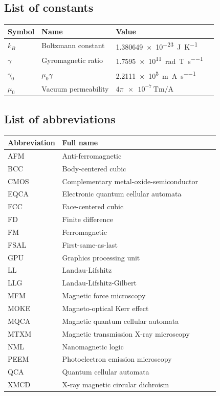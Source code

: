 \documentclass[11pt,a4paper,english]{article}
\begin{document}
\vspace*{\fill}


\clearpage
{\hypersetup{linkcolor=black}
\setcounter{tocdepth}{2}
\tableofcontents
}
\newpage
\subsection*{List of constants}
\begin{longtable}{llll}
\toprule
\bfseries Symbol & \bfseries Name &
\bfseries Value \\\midrule\endhead
$k_B$ & Boltzmann constant & \SI{1.380649e-23}{\joule\per\kelvin} \\
\midrule
$\gamma$ & Gyromagnetic ratio & \SI{1.7595e11}{\radian\per\tesla\per\second} \\
$\gamma_0$ & $\mu_0 \gamma$ & \SI{2.2111e5}{\metre\per\ampere\per\second} \\
$\mu_0$ & Vacuum permeability & $4\pi\SI{e-7}{\tesla\metre\per\ampere}$ \\
\bottomrule
\end{longtable}

\subsection*{List of abbreviations}
\begin{longtable}{llll}
\toprule
\bfseries Abbreviation & \bfseries Full name \\\midrule\endhead
AFM & Anti-ferromagnetic \\
BCC & Body-centered cubic \\
CMOS & Complementary metal-oxide-semiconductor \\
EQCA & Electronic quantum cellular automata \\
FCC & Face-centered cubic \\
FD & Finite difference \\
FM & Ferromagnetic \\
FSAL & First-same-as-last \\
GPU & Graphics processing unit \\
LL & Landau-Lifshitz \\
LLG & Landau-Lifshitz-Gilbert \\
MFM & Magnetic force microscopy \\
MOKE & Magneto-optical Kerr effect \\
MQCA & Magnetic quantum cellular automata \\
MTXM & Magnetic transmission X-ray microscopy \\
NML & Nanomagnetic logic \\
PEEM & Photoelectron emission microscopy \\
QCA & Quantum cellular automata \\
XMCD & X-ray magnetic circular dichroism \\
\bottomrule
\end{longtable}
\end{document}
